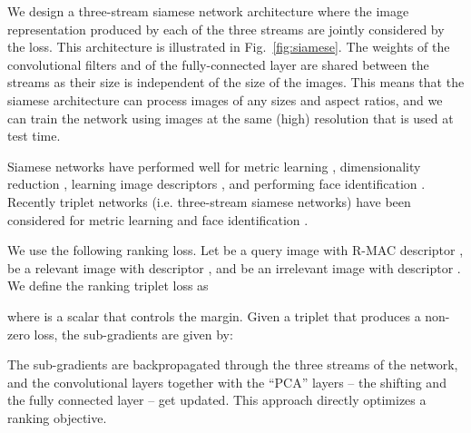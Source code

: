 \documentclass[twocolumn]{svjour3}          \smartqed  \usepackage{graphicx}
\begin{document}
We design a three-stream siamese network architecture where the image representation produced by each of the three streams are jointly considered by the loss. This architecture is illustrated in Fig.~\ref{fig:siamese}. The weights of the convolutional filters and of the fully-connected layer are shared between the  streams as their size is independent of the size of the images. This means that the siamese architecture can process images of any sizes and aspect ratios, and we can train the network using images at the same (high) resolution that is used at test time. 

Siamese networks have performed well for metric learning \citep{Song2015}, dimensionality reduction \citep{Hadsell2006}, learning image descriptors \citep{Serra2015}, and performing face identification \citep{Chopra2005,Hu2014,Sun2014}. Recently triplet networks (i.e. three-stream siamese networks) have been considered for metric learning \citep{Hoffer2015,Wang2014} and face identification \citep{SchroffK2015}. 

We use the following ranking loss. Let  be a query image with R-MAC descriptor ,  be a relevant image with descriptor , and  be an irrelevant image with descriptor .
We define the ranking triplet loss as

where  is a scalar that controls the margin. 
Given a triplet that produces a non-zero loss, the sub-gradients are given by:


The sub-gradients are backpropagated through the three streams of the
network, and the convolutional layers together with the ``PCA'' layers -- the shifting and the fully connected layer -- get updated.
This approach directly optimizes a ranking objective.
\end{document}
